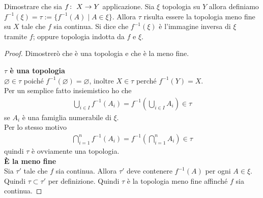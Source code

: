 \begin{theorem}
	Dimostrare che sia $f \colon\ X \rightarrow Y$ applicazione. Sia $\xi$ topologia su $Y$ allora definiamo $f^{-1}(\xi) = \tau := \{f^{-1}(A) \; | \; A \in \xi \}$. Allora $\tau$ risulta essere la topologia meno fine su $X$ tale che $f$ sia continua. Si dice che $f^{-1}(\xi)$ è l'immagine inversa di $\xi$ tramite $f$; oppure topologia indotta da $f$ e $\xi$.
\end{theorem}
\begin{proof}
	Dimostrerò che è una topologia e che è la meno fine.
	
	\textbf{$\tau$ è una topologia}\\
	
	$\varnothing \in \tau$ poiché $f^{-1}(\varnothing) = \varnothing$, inoltre $X \in \tau$ perché $f^{-1}(Y) = X$. \\
	Per un semplice fatto insiemistico ho che 
	\begin{equation}
	\begin{aligned}
		\bigcup_{i \in I} f^{-1}(A_i) = f^{-1}\left(\bigcup_{i \in I} A_i\right) \in \tau 
	\end{aligned}
	\end{equation}
	se $A_i$ è una famiglia numerabile di $\xi$.\\
	Per lo stesso motivo
	\begin{equation}
	\begin{aligned}
			\bigcap^n_{i=1} f^{-1}(A_i) = f^{-1}\left(\bigcap^{n}_{i=1} A_i\right) \in \tau
	\end{aligned}
	\end{equation}
	quindi $\tau$ è ovviamente una topologia.\\
	
	\textbf{È la meno fine}\\
	Sia $\tau'$ tale che $f$ sia continua. Allora $\tau'$ deve contenere $f^{-1}(A)$ per ogni $A\in \xi$. Quindi $\tau \subset \tau'$ per definizione. Quindi $\tau$ è la topologia meno fine affinché $f$ sia continua.
\end{proof}

